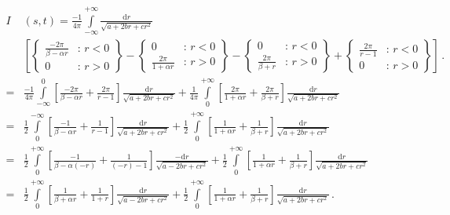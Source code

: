 \begin{align}
 I&(s,t) = \frac{-1}{4 \pi}
           \int\limits_{-\infty}^{+\infty}
            \frac{\mathrm{d}r}
                 {\sqrt{a + 2 b r + c r^2}}  \nonumber \\
   ~     &  \left[
             \left\{\begin{aligned}
              \frac{-2\pi}{\beta-\alpha r} &:\, r<0 \\
              0                            &:\, r>0
             \end{aligned}\right\}
           - \left\{\begin{aligned}
              0                        &:\, r<0 \\
              \frac{ 2\pi}{1+\alpha r} &:\, r>0
             \end{aligned}\right\}
           - \left\{\begin{aligned}
               0                      &:\, r<0 \\
               \frac{2\pi}{\beta + r} &:\, r>0
             \end{aligned}\right\}
           + \left\{\begin{aligned}
              \frac{2 \pi}{r-1} &:\, r<0 \\
              0                 &:\, r>0
             \end{aligned}\right\}
           \right] \, . \nonumber \\
 =& \frac{-1}{4 \pi}
    \int\limits_{-\infty}^{0}
      \left[ \frac{-2 \pi}{\beta - \alpha r} + \frac{2 \pi}{r - 1} \right]
      \frac{\mathrm{d}r}
           {\sqrt{a + 2 b r + c r^2}}
  + \frac{1}{4 \pi}\int\limits_{0}^{+\infty}
      \left[ \frac{2 \pi}{1 + \alpha r} + \frac{2 \pi}{\beta + r} \right]
      \frac{\mathrm{d}r}
           {\sqrt{a + 2 b r + c r^2}} \nonumber \\
 =& \frac{1}{2}
    \int\limits_{0}^{-\infty}
      \left[ \frac{-1}{\beta - \alpha r} + \frac{1}{r - 1} \right]
      \frac{\mathrm{d}r}
           {\sqrt{a + 2 b r + c r^2}}
  + \frac{1}{2}\int\limits_{0}^{+\infty}
      \left[ \frac{1}{1 + \alpha r} + \frac{1}{\beta + r} \right]
      \frac{\mathrm{d}r}
           {\sqrt{a + 2 b r + c r^2}} \nonumber \\
 =& \frac{1}{2}
    \int\limits_{0}^{+\infty}
      \left[ \frac{-1}{\beta - \alpha (-r)} + \frac{1}{(-r) - 1} \right]
      \frac{-\mathrm{d}r}
           {\sqrt{a - 2 b r + c r^2}}
  + \frac{1}{2}\int\limits_{0}^{+\infty}
      \left[ \frac{1}{1 + \alpha r} + \frac{1}{\beta + r} \right]
      \frac{\mathrm{d}r}
           {\sqrt{a + 2 b r + c r^2}} \nonumber \\
 =& \frac{1}{2}
    \int\limits_{0}^{+\infty}
      \left[ \frac{1}{\beta + \alpha r} + \frac{1}{1 + r} \right]
      \frac{\mathrm{d}r}
           {\sqrt{a - 2 b r + c r^2}}
  + \frac{1}{2}\int\limits_{0}^{+\infty}
      \left[ \frac{1}{1 + \alpha r} + \frac{1}{\beta + r} \right]
      \frac{\mathrm{d}r}
           {\sqrt{a + 2 b r + c r^2}} \, . \label{eqn:int_I_split}
\end{align}
